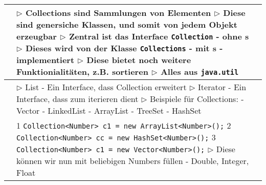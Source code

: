 	\begin{table}[H]
	\label{Collections}
	\begin{tabular}{ | p{4cm} p{13.5cm} | }
	

	\hline
	\makecell[l]{Nutzen} & 
	\makecell[l]
	{
	$\rhd$ Collections sind Sammlungen von Elementen \\
	$\rhd$ Diese sind genersiche Klassen, und somit von jedem Objekt erzeugbar \\
	$\rhd$ Zentral ist das Interface \texttt{Collection} - ohne s \\
	$\rhd$ Dieses wird von der Klasse \texttt{Collections} - mit s - implementiert \\
	$\rhd$ Diese bietet noch weitere Funktionialitäten, z.B. sortieren \\
	$\rhd$ Alles aus \texttt{java.util} \\
	} 	\\ \hline


	\makecell[l]{Elemente} & 
	\makecell[l]
	{
	$\rhd$ List - Ein Interface, dass Collection erweitert \\
	$\rhd$ Iterator - Ein Interface, dass zum iterieren dient \\
	$\rhd$ Beispiele für Collections: \\
	\hspace{0.4cm} - Vector \\
	\hspace{0.4cm} - LinkedList \\
	\hspace{0.4cm} - ArrayList \\
	\hspace{0.4cm} - TreeSet \\
	\hspace{0.4cm} - HashSet \\
	} 	\\ \hline


	\makecell[l]{Beispiel: Collection} & 
	\makecell[l]
	{
	\hspace{0.5cm}  1 \hspace{0.4cm} \texttt{Collection<Number> c1 = new ArrayList<Number>();} \\
	\hspace{0.5cm}  2 \hspace{0.4cm} \texttt{Collection<Number> cc = new HashSet<Number>();} \\
	\hspace{0.5cm}  3 \hspace{0.4cm} \texttt{Collection<Number> c1 = new Vector<Number>();} \\
	$\rhd$ Diese können wir nun mit beliebigen Numbers füllen - Double, Integer, Float \\
	} 	\\ \hline



\end{tabular}
\end{table}
